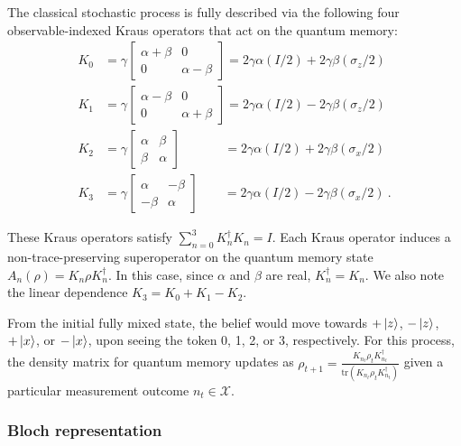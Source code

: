 \documentclass[prx,nofootinbib,onecolumn,showkeys,groupaddress,preprintnumbers,floatfix,
superscriptaddress]{revtex4-1}
\newcommand{\tr}{\text{tr}}
\begin{document}
The classical stochastic process is fully described via the following four observable-indexed Kraus operators that act on the quantum memory:
\begin{align}
K_0 &= \gamma \begin{bmatrix}
    \alpha+\beta & 0 \\
    0 & \alpha - \beta
\end{bmatrix}
= 2 \gamma \alpha (I/2) + 2 \gamma \beta (\sigma_z / 2) \\
% 
K_1 &= \gamma \begin{bmatrix}
    \alpha-\beta & 0 \\
    0 & \alpha + \beta
\end{bmatrix}
= 2 \gamma \alpha (I/2) - 2 \gamma \beta (\sigma_z / 2) \\
% 
K_2 &= \gamma \begin{bmatrix}
    \alpha & \beta \\
    \beta & \alpha 
\end{bmatrix}
\qquad \quad \; \, = 2 \gamma \alpha (I/2) + 2 \gamma \beta (\sigma_x / 2) \\
% 
K_3 &= \gamma \begin{bmatrix}
    \alpha & -\beta \\
    -\beta & \alpha 
\end{bmatrix}
\qquad = 2 \gamma \alpha (I/2) - 2 \gamma \beta (\sigma_x / 2) 
~.
% 
\end{align}

These Kraus operators satisfy
$\sum_{n=0}^3 K_n^\dagger K_n = I$.
Each Kraus operator induces a non-trace-preserving superoperator on the quantum memory state $A_n(\rho) = K_n \rho K_n^\dagger$.
In this case, since $\alpha$ and $\beta$ are real, $K_n^\dagger = K_n$.
We also note the linear dependence
$K_3 = K_0 + K_1 - K_2$.

From the initial fully mixed state, the belief would move towards $+\ket{z}$,
$-\ket{z}$,
$+\ket{x}$,
or 
$-\ket{x}$,
upon seeing the token
0, 1, 2, or 3, respectively.
For this process, 
the density matrix for quantum memory updates as 
$\rho_{t+1} = \frac{K_{n_t} \rho_t K_{n_t}^\dagger}{\tr( K_{n_t} \rho_t K_{n_t}^\dagger)}$ given a particular measurement outcome $n_t \in \mathcal{X}$.

\subsubsection{Bloch representation}
\end{document}
